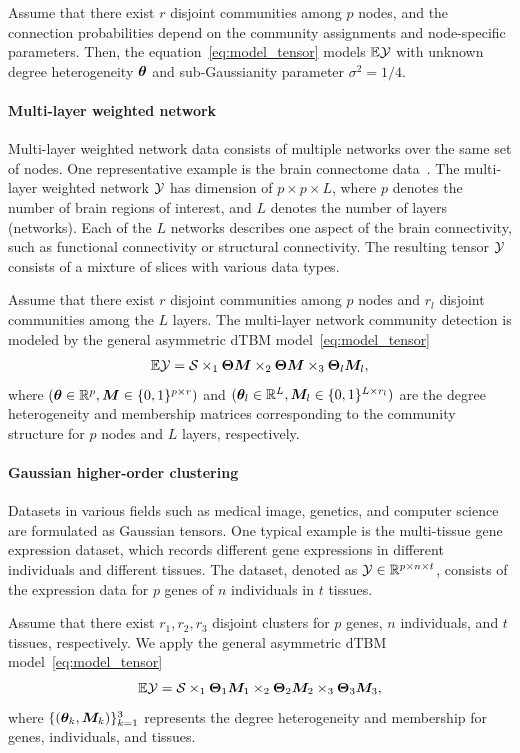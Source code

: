 \documentclass[journal]{IEEEtran}
\theoremstyle{definition}
\theoremstyle{definition}
\begin{document}
Assume that there exist $r$ disjoint communities among $p$ nodes, and the connection probabilities depend on the community assignments and node-specific parameters. 
Then, the equation~\eqref{eq:model_tensor} models $\mathbb{E} \mathcal{Y}$ with unknown degree heterogeneity $\boldsymbol{\theta}$ and sub-Gaussianity parameter $\sigma^2 = 1/4$.

\paragraph{Multi-layer weighted network} 
Multi-layer weighted network data consists of multiple networks over the same set of nodes. One representative example is the brain connectome data~\citep{zhang2019tensor}. The multi-layer weighted network $\mathcal{Y}$ has dimension of $p \times p \times L$, where $p$ denotes the number of brain regions of interest, and $L$ denotes the number of layers (networks). Each of the $L$ networks describes one aspect of the brain connectivity, such as functional connectivity or structural connectivity. The resulting tensor $\mathcal{Y}$ consists of a mixture of slices with various data types. 


Assume that there exist $r$ disjoint communities among $p$ nodes and $r_l$ disjoint communities among the $L$ layers. The multi-layer network community detection is modeled by the general asymmetric dTBM model~\eqref{eq:model_tensor}
\begin{equation}
    \mathbb{E} \mathcal{Y} = \mathcal{S} \times_1 \boldsymbol{\Theta} \bm M \times_2 \boldsymbol{\Theta} \bm M \times_3 \boldsymbol{\Theta}_l \bm M_l, 
\end{equation}
where $(\boldsymbol{\theta} \in \mathbb{R}^p, \bm M \in \{0,1\}^{p \times r})$ and $ (\boldsymbol{\theta}_l \in \mathbb{R}^L, \bm M_l \in \{0,1\}^{L \times r_l})$ are the degree heterogeneity and membership matrices corresponding to the community structure for $p$ nodes and $L$ layers, respectively. 

\paragraph{Gaussian higher-order clustering} Datasets in various fields such as medical image, genetics, and computer science are formulated as Gaussian tensors. One typical example is the multi-tissue gene expression dataset, which records different gene expressions in different individuals and different tissues. The dataset, denoted as $\mathcal{Y} \in \mathbb{R}^{p \times n \times t}$, consists of the expression data for $p$ genes of $n$ individuals in $t$ tissues. 

Assume that there exist $r_1, r_2, r_3$ disjoint clusters for $p$ genes, $n$ individuals, and $t$ tissues, respectively. We apply the general asymmetric dTBM model~\eqref{eq:model_tensor} 
\begin{equation}
    \mathbb{E}\mathcal{Y} = \mathcal{S} \times_1 \boldsymbol{\Theta}_1 \bm M_1 \times_2 \boldsymbol{\Theta}_2 \bm M_2 \times_3 \boldsymbol{\Theta}_3 \bm M_3, 
\end{equation}
where $\{(\boldsymbol{\theta}_k, \bm M_k)\}_{k=1}^3$ represents the degree heterogeneity and membership for genes, individuals, and tissues.
\end{document}
